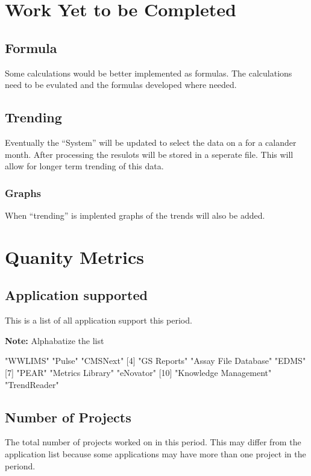 \documentclass{article}
\begin{document}
\section{Work Yet to be Completed}
\subsection{Formula}
Some calculations would be better implemented as formulas. The calculations need
to be evulated and the formulas developed where needed.
\subsection{Trending}
Eventually the ``System'' will be updated to select the data on a for a calander
month. After processing the resulots will be stored in a seperate file.
This will allow for longer term trending of this data.
\subsubsection{Graphs}
When ``trending'' is implented graphs of the trends will also be added.


\section{Quanity Metrics}
\subsection{Application supported}
This is a list of all application support this period.

\textbf{Note:} Alphabatize the list

\begin{Schunk}
\begin{Soutput}
 [1] "WWLIMS"               "Pulse"                "CMSNext"             
 [4] "GS Reports"           "Assay File Database"  "EDMS"                
 [7] "PEAR"                 "Metrics Library"      "eNovator"            
[10] "Knowledge Management" "TrendReader"         
\end{Soutput}
\end{Schunk}

\subsection{Number of Projects}
The total number of  projects worked on in this period. This may differ from the
application list because some applications may have more than one project in
the periond.
\end{document}
